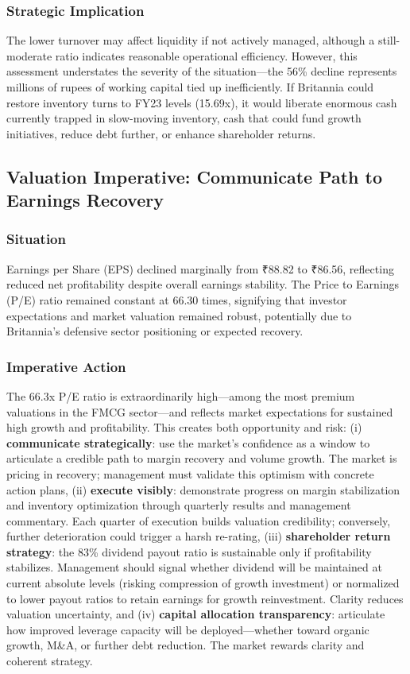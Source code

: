 \documentclass[12pt, a4paper]{report}
\begin{document}
\subsubsection{Strategic Implication}
The lower turnover may affect liquidity if not actively managed, although a still-moderate ratio indicates reasonable operational efficiency. However, this assessment understates the severity of the situation—the 56\% decline represents millions of rupees of working capital tied up inefficiently. If Britannia could restore inventory turns to FY23 levels (15.69x), it would liberate enormous cash currently trapped in slow-moving inventory, cash that could fund growth initiatives, reduce debt further, or enhance shareholder returns.

\subsection{Valuation Imperative: Communicate Path to Earnings Recovery}

\subsubsection{Situation}
Earnings per Share (EPS) declined marginally from ₹88.82 to ₹86.56, reflecting reduced net profitability despite overall earnings stability. The Price to Earnings (P/E) ratio remained constant at 66.30 times, signifying that investor expectations and market valuation remained robust, potentially due to Britannia's defensive sector positioning or expected recovery.

\subsubsection{Imperative Action}
The 66.3x P/E ratio is extraordinarily high—among the most premium valuations in the FMCG sector—and reflects market expectations for sustained high growth and profitability. This creates both opportunity and risk: (i) \textbf{communicate strategically}: use the market's confidence as a window to articulate a credible path to margin recovery and volume growth. The market is pricing in recovery; management must validate this optimism with concrete action plans, (ii) \textbf{execute visibly}: demonstrate progress on margin stabilization and inventory optimization through quarterly results and management commentary. Each quarter of execution builds valuation credibility; conversely, further deterioration could trigger a harsh re-rating, (iii) \textbf{shareholder return strategy}: the 83\% dividend payout ratio is sustainable only if profitability stabilizes. Management should signal whether dividend will be maintained at current absolute levels (risking compression of growth investment) or normalized to lower payout ratios to retain earnings for growth reinvestment. Clarity reduces valuation uncertainty, and (iv) \textbf{capital allocation transparency}: articulate how improved leverage capacity will be deployed—whether toward organic growth, M\&A, or further debt reduction. The market rewards clarity and coherent strategy.
\end{document}
